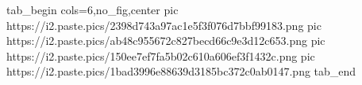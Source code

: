 
 
 
 
 

\ifcmt
  tab_begin cols=6,no_fig,center
		 pic https://i2.paste.pics/2398d743a97ac1e5f3f076d7bbf99183.png
		 pic https://i2.paste.pics/ab48c955672c827becd66c9e3d12c653.png
		 pic https://i2.paste.pics/150ee7ef7fa5b02c610a606ef3f1432c.png
		 pic https://i2.paste.pics/1bad3996e88639d3185bc372c0ab0147.png
  tab_end
\fi
